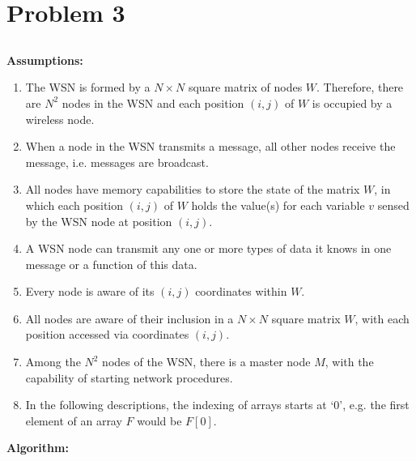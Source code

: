 \documentclass[paper=a4, fontsize=11pt]{scrartcl} %
\numberwithin{equation}{section} %
\numberwithin{figure}{section} %
\numberwithin{table}{section} %
\begin{document}
\section{Problem 3}

\subsection{}
\label{subsec:3-1}

\textbf{Assumptions:}

\begin{enumerate}

    \item The WSN is formed by a $N \times N$ square matrix of nodes $W$. 
            Therefore, there are $N^2$ nodes in the WSN and each position 
            $(i,j)$ of $W$ is occupied by a wireless node.
    \item When a node in the WSN transmits a message, all other nodes receive 
            the message, i.e. messages are broadcast.
    \item All nodes have memory capabilities to store the state of the matrix $W$, 
            in which each position $(i,j)$ of $W$ holds the value(s) for each 
            variable $v$ sensed by the WSN node at position $(i,j)$.
    \item A WSN node can transmit any one or more types of data it knows in one 
            message or a function of this data.
    \item Every node is aware of its $(i,j)$ coordinates within $W$.
    \item All nodes are aware of their inclusion in a $N \times N$ square 
            matrix $W$, with each position accessed via coordinates $(i,j)$.
    \item Among the $N^2$ nodes of the WSN, there is a master node $M$, with 
            the capability of starting network procedures.
    \item In the following descriptions, the indexing of arrays starts at `0', 
            e.g. the first element of an array $F$ would be $F[0]$.

\end{enumerate}

\textbf{Algorithm:}
\end{document}
